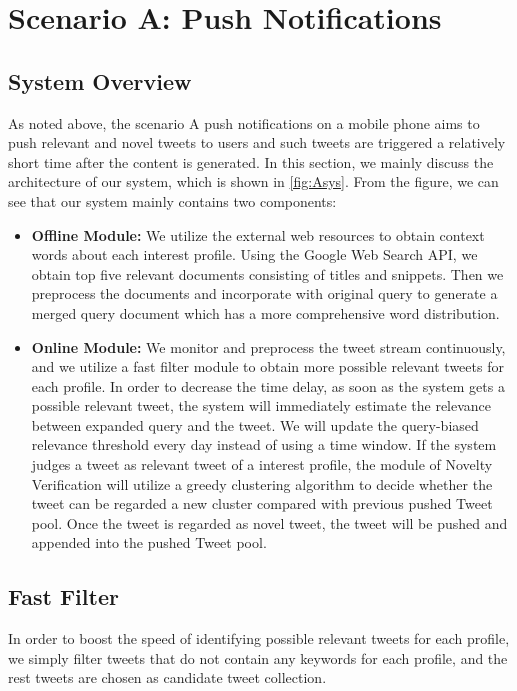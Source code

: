 \section{Scenario A: Push Notifications}
\subsection{System Overview}
As noted above, the scenario A push notifications on a mobile phone aims to push relevant and novel tweets to users and such tweets are triggered a relatively short time after the content is generated.
In this section, we mainly discuss the architecture of our system, which is shown in \ref{fig:Asys}.
From the figure, we can see that our system mainly contains two components:
\begin{itemize}
\item \textbf{Offline Module:} We utilize the external web resources to obtain context words about each interest profile. Using the Google Web Search API, we obtain top five relevant documents consisting of titles and snippets. 
Then we preprocess the documents and incorporate with original query to generate a merged query document which has a more comprehensive word distribution.
\item \textbf{Online Module:} We monitor and preprocess the tweet stream continuously, and we utilize a fast filter module to obtain more possible relevant tweets for each profile. In order to decrease the time delay, as soon as the system gets a possible relevant tweet, the system will immediately estimate the relevance between expanded query and the tweet. We will update the query-biased relevance threshold every day instead of using a time window.
If the system judges a tweet as relevant tweet of a interest profile, the module of Novelty Verification will utilize a greedy clustering algorithm to decide whether the tweet can be regarded a new cluster compared with previous pushed Tweet pool. Once the tweet is regarded as novel tweet, the tweet will be pushed and appended into the pushed Tweet pool.
\end{itemize}

\subsection{Fast Filter}
In order to boost the speed of identifying possible relevant tweets for each profile, 
we simply filter tweets that do not contain any keywords for each profile,
and the rest tweets are chosen as candidate tweet collection.

